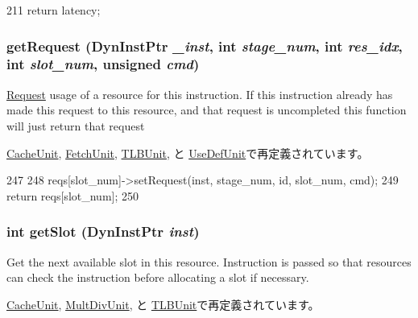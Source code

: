 \begin{DoxyCode}
211 { return latency; }
\end{DoxyCode}
\hypertarget{classResource_aae5ce84f94a1057d7f60172daf5d731d}{
\subsubsection[{getRequest}]{ getRequest ({\bf DynInstPtr} {\em \_\-inst}, \/  int {\em stage\_\-num}, \/  int {\em res\_\-idx}, \/  int {\em slot\_\-num}, \/  unsigned {\em cmd})}}
\label{classResource_aae5ce84f94a1057d7f60172daf5d731d}
\hyperlink{classRequest}{Request} usage of a resource for this instruction. If this instruction already has made this request to this resource, and that request is uncompleted this function will just return that request 

\hyperlink{classCacheUnit_aae5ce84f94a1057d7f60172daf5d731d}{CacheUnit}, \hyperlink{classFetchUnit_aae5ce84f94a1057d7f60172daf5d731d}{FetchUnit}, \hyperlink{classTLBUnit_a98b2e8ae07f180e62be1d03beae400f9}{TLBUnit}, と \hyperlink{classUseDefUnit_aae5ce84f94a1057d7f60172daf5d731d}{UseDefUnit}で再定義されています。


\begin{DoxyCode}
247 {
248     reqs[slot_num]->setRequest(inst, stage_num, id, slot_num, cmd);
249     return reqs[slot_num];
250 }
\end{DoxyCode}
\hypertarget{classResource_ab3ba2ee95c723c8c056db0a1f2a6dfd3}{
\subsubsection[{getSlot}]{\setlength{\rightskip}{0pt plus 5cm}int getSlot ({\bf DynInstPtr} {\em inst})}}
\label{classResource_ab3ba2ee95c723c8c056db0a1f2a6dfd3}
Get the next available slot in this resource. Instruction is passed so that resources can check the instruction before allocating a slot if necessary. 

\hyperlink{classCacheUnit_ab3ba2ee95c723c8c056db0a1f2a6dfd3}{CacheUnit}, \hyperlink{classMultDivUnit_ab3ba2ee95c723c8c056db0a1f2a6dfd3}{MultDivUnit}, と \hyperlink{classTLBUnit_ab3ba2ee95c723c8c056db0a1f2a6dfd3}{TLBUnit}で再定義されています。


